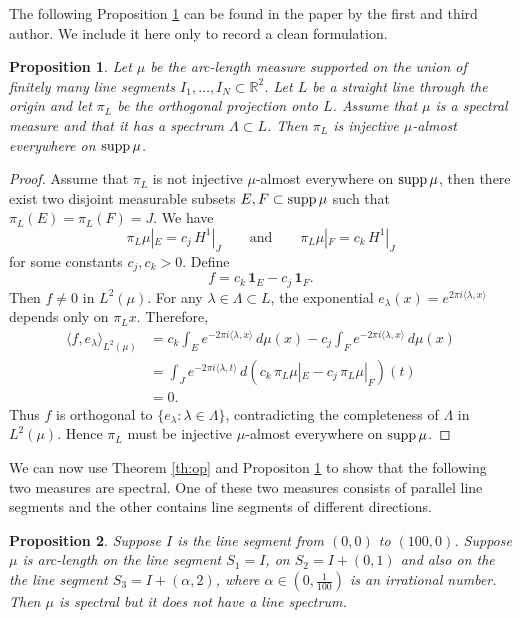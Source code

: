 \documentclass[12pt,a4paper,intlimits,sumlimits]{amsart}
\theoremstyle{plain}
\newtheorem{proposition}{Proposition}
\theoremstyle{definition}
\newcommand{\supp}{{\rm supp\,}}
\newcounter{rem}
\begin{document}
The following Proposition \ref{propline-2} can be found in the  paper  \cite[{\S}4]{kolountzakis2025spectrality} by the first and third author. We include it here only to record a clean formulation.
  

\begin{proposition}\label{propline-2}
Let $\mu$ be the arc-length measure supported on the union of finitely many line segments
$I_1,\dots, I_N\subset \mathbb{R}^2$. 
Let $L$ be a straight line through the origin and let $\pi_L$ be the orthogonal projection onto $L$.
Assume that $\mu$ is a spectral measure and that it has a spectrum $\Lambda\subset L$.
Then $\pi_L$ is injective $\mu$-almost everywhere on $\supp\mu$.
\end{proposition}
\begin{proof}
Assume that $\pi_L$ is not injective $\mu$-almost everywhere on $\supp\mu$,
 then there exist two disjoint measurable subsets 
$E, F \subset \supp\mu$  such that
$\pi_L(E)=\pi_L(F)=J$. We have 
$$
\pi_{L}\mu|_E=c_j\,H^1|_J\qquad \text{and}
\qquad
\pi_{L}\mu|_F=c_k\,H^1|_J
$$
for some constants $c_j,c_k>0$.
Define
\[
f=c_k\,\mathbf{1}_E-c_j\,\mathbf{1}_F.
\]
Then $f\neq 0$ in $L^2(\mu)$.
For any $\lambda\in\Lambda\subset L$, the exponential
 $ 
e_\lambda(x)=e^{2\pi i\langle \lambda,x\rangle}
 $ 
depends only on $\pi_L x$. Therefore,
\begin{align*}
\langle f,e_\lambda\rangle_{L^2(\mu)}
&=
c_k\int_E e^{-2\pi i\langle \lambda,x\rangle}\,d\mu(x)
-
c_j\int_F e^{-2\pi i\langle \lambda,x\rangle}\,d\mu(x)\\
&=
\int_J e^{-2\pi i\langle \lambda,t\rangle}\,
d(c_k\,\pi_{L}\mu|_E-c_j\,\pi_{L}\mu|_F)(t)\\
&=0.
\end{align*}
Thus $f$ is orthogonal to $\{e_\lambda:\lambda\in\Lambda\}$, contradicting the completeness
of $\Lambda$ in $L^2(\mu)$. Hence $\pi_L$ must be injective $\mu$-almost everywhere on $\supp\mu$.

\end{proof}



We can now use Theorem \ref{th:op} and   Propositon \ref{propline-2}  to show that the following two measures are spectral. One of these two measures consists of parallel line segments and the other contains line segments of different directions.

\begin{proposition}\label{th:parallel}
Suppose $I$ is the line segment from $(0, 0)$ to $(100, 0)$.
Suppose $\mu$ is arc-length on the line segment $S_1 = I$, on $S_2 = I+(0, 1)$ and also on the the line segment $S_3 = I+(\alpha, 2)$, where $\alpha \in (0, \frac{1}{100})$ is an irrational number. Then $\mu$ is spectral but it does not have a line spectrum.
\end{proposition}
\end{document}

